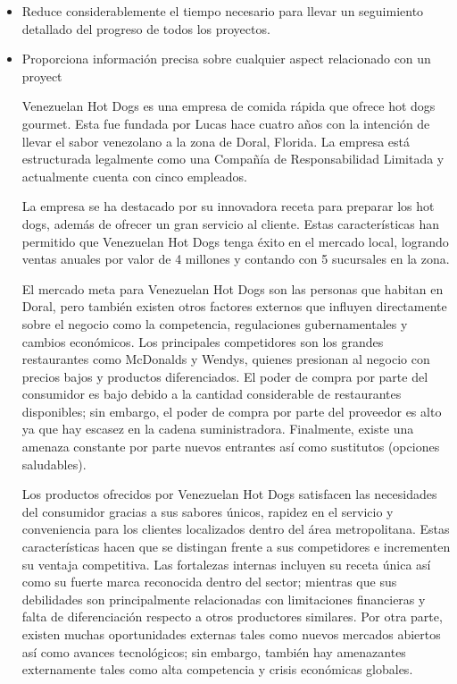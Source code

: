                 \begin{itemize} 
                    \item Reduce considerablemente el tiempo necesario para llevar un seguimiento detallado del progreso de todos los proyectos. 
                    \item Proporciona información precisa sobre cualquier aspect relacionado con un proyect

                Venezuelan Hot Dogs es una empresa de comida rápida que ofrece hot dogs gourmet. Esta fue fundada por Lucas hace cuatro años con la intención de llevar el sabor venezolano a la zona de Doral, Florida. La empresa está estructurada legalmente como una Compañía de Responsabilidad Limitada y actualmente cuenta con cinco empleados.

                La empresa se ha destacado por su innovadora receta para preparar los hot dogs, además de ofrecer un gran servicio al cliente. Estas características han permitido que Venezuelan Hot Dogs tenga éxito en el mercado local, logrando ventas anuales por valor de 4 millones y contando con 5 sucursales en la zona.

                El mercado meta para Venezuelan Hot Dogs son las personas que habitan en Doral, pero también existen otros factores externos que influyen directamente sobre el negocio como la competencia, regulaciones gubernamentales y cambios económicos. Los principales competidores son los grandes restaurantes como McDonalds y Wendys, quienes presionan al negocio con precios bajos y productos diferenciados. El poder de compra por parte del consumidor es bajo debido a la cantidad considerable de restaurantes disponibles; sin embargo, el poder de compra por parte del proveedor es alto ya que hay escasez en la cadena suministradora. Finalmente, existe una amenaza constante por parte nuevos entrantes así como sustitutos (opciones saludables).

Los productos ofrecidos por Venezuelan Hot Dogs satisfacen las necesidades del consumidor gracias a sus sabores únicos, rapidez en el servicio y conveniencia para los clientes localizados dentro del área metropolitana. Estas características hacen que se distingan frente a sus competidores e incrementen su ventaja competitiva. Las fortalezas internas incluyen su receta única así como su fuerte marca reconocida dentro del sector; mientras que sus debilidades son principalmente relacionadas con limitaciones financieras y falta de diferenciación respecto a otros productores similares. Por otra parte, existen muchas oportunidades externas tales como nuevos mercados abiertos así como avances tecnológicos; sin embargo, también hay amenazantes externamente tales como alta competencia y crisis económicas globales.


\end{itemize}
